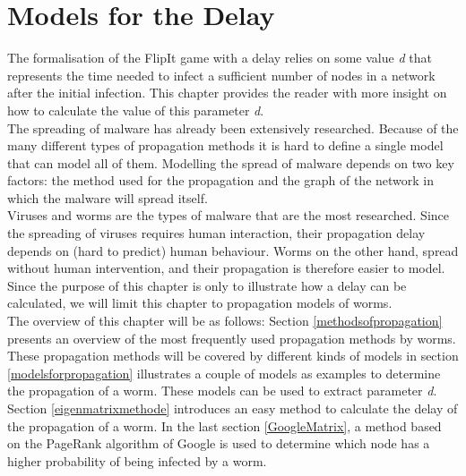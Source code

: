 \chapter{Models for the Delay}
\label{chapter4: Worm propagation}



The formalisation of the FlipIt game with a delay relies on some value  \textit{d} that represents the time needed to infect a sufficient number of nodes in a network after the initial infection. This chapter provides the reader with more insight on how to calculate the value of this parameter \textit{d}.  \\

The  spreading of malware has already been extensively researched. Because of the many different types of propagation methods it is hard to define a single model that can model all of them. Modelling the spread of malware depends on two key factors: the method used for the propagation and the graph of the network in which the malware will spread itself. \\
Viruses and worms are the types of malware that are the most researched. Since the spreading of viruses requires human interaction, their propagation delay depends on (hard to predict) human behaviour. Worms on the other hand, spread without human intervention, and their propagation is therefore easier to model. Since the purpose of this chapter is only to illustrate how a delay can be calculated, we will limit this chapter to propagation models of worms. \\

The overview of this chapter will be as follows: Section \ref{methodsofpropagation} presents an overview of the most frequently used propagation methods by worms. These propagation methods will be covered by different kinds of models in section \ref{modelsforpropagation} illustrates a couple of models as examples to determine the propagation of a worm. These models can be used to extract parameter \textit{d}. Section \ref{eigenmatrixmethode} introduces an easy method to calculate the delay of the propagation of a worm. In the last section \ref{GoogleMatrix}, a method based on the PageRank algorithm of Google is used to determine which node has a higher probability of being infected by a worm. %



